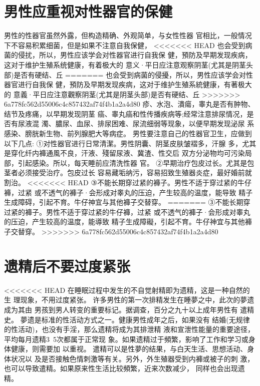 \documentclass[12pt,UTF8]{ctexbook}
\begin{document}
\section{男性应重视对性器官的保健}

男性的性器官虽然外露，但构造精确、外观简单，与女性性器
官相比，一般情况下不容易积累细菌，但是如果不注意自我保健，
<<<<<<< HEAD
也会受到病菌的侵扰，所以，男性应该学会对性器官进行自我保
健，預防及早期发现疾病，这对于维护生殖系统健康，有着极大的
意义·平日应注意观察阴茎(尤其是阴茎头部)是否有硬结、丘
=======
也会受到病菌的侵擾，所以，男性应该学会对性器官进行自我保
健，預防及早期发现疾病，这对于维护生殖系統健康，有著极大的
意義·平日应注意觀察阴茎(尤其是阴茎头部)是否有硬结、丘
>>>>>>> 6a778fc562d55006c4c857432af74f4b1a2a4d80
疹、水泡、潰瘍，睾丸是否有肿物、结节及疼痛，以早期发现阴茎
癌、睾丸癌和性传播疾病等;经常注意排尿情况，是否有尿液混
濁、膿尿、血尿、排尿困难、尿流细弱等现象，以便早期发现泌尿
系感染、膀胱新生物、前列腺肥大等病症。
男性要注意自己的性器官卫生，应做到以下几点:
①对性器官进行日常清潔。男性阴囊、阴茎皮肤皱褶多，汗腺
多，尤其是穿化纤内褲通風不良，汗液、殘留尿液、冀渣、性交后
双方分泌物均可污染局部，引起感染。所以，每天睡前应清洗性器
官。
②早期治疗包皮过长。尤其是包茎者必须接受治疗。包皮过长
容易藏垢纳污，容易招致生殖器炎症，最好婚前就割治。
<<<<<<< HEAD
③不能长期穿过紧的褲子。男性不适于穿过紧的牛仔褲，过紧
或不透气的褲子·会形成对睾丸的压迫，产生较高的温度，能导致
精子生成障碍，引起不育。牛仔神宜与其他褲子交替穿。
=======
③不能长期穿过紧的褲子。男性不适于穿过紧的牛仔褲，过紧
或不透气的褲子·会形成对睾丸的压迫，产生较高的温度，能導致
精子生成障礙，引起不育。牛仔神宜与其他褲子交替穿。
>>>>>>> 6a778fc562d55006c4c857432af74f4b1a2a4d80

\section{遗精后不要过度紧张}

<<<<<<< HEAD
在睡眠过程中发生的不自觉射精即为遗精，这是一种自然的生
理现象，不用过度紧张。
许多男性的第一次排精发生在睡夢之中，此次的夢遗成为其由
男孩到男人转变的重要标记。据调查，百分之九十以上成年男性有
遣精史。
夢遗是标准的性活动方式之一。健康男性成年之后，如果没有
结婚(无规律的性活动)，也没有手淫，那么遗精将成为其排泄精
液和宣泄性能量的重要途径，平均每月遗精3~5次都属于正常现
象。如果遗精过于頻繁，影响了工作和学习或身体健康，则需要加
以重视。
遣精可以是性夢的结果，与白天生活、思想活动、身体状况以
及是否接触色情刺激等有关。另外，外生殖器受到内褲或被子的刺
激，也可以导致遣精。如果原来性生活比较頻繁，近来次数减少，
同样也会出现遗精。
\end{document}
